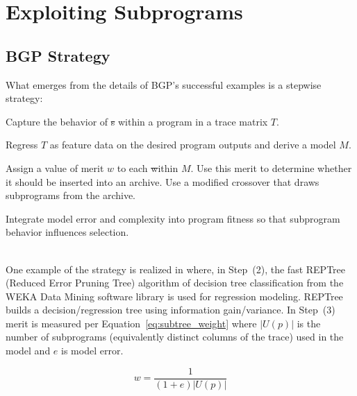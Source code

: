 \section{Exploiting Subprograms}\label{sect:foreground}
\subsection{BGP Strategy}
What emerges from the details of BGP's successful examples is a stepwise strategy:  
\begin{inparaenum}

\item Capture the behavior of \st{s} within a program in a trace matrix $T$.

\item  Regress $T$ as feature data on the desired program outputs and derive a model $M$. 

\item Assign a value of merit $w$ to each \st within $M$. Use this merit to determine whether it should be inserted into an archive. Use a modified crossover that draws subprograms from the archive. 

\item Integrate model error and complexity into program fitness so that subprogram behavior influences selection.
\end{inparaenum} \\


One example of the strategy is realized in \cite{krawiecGecco2014} where, in Step~(2), the fast REPTree (Reduced  Error  Pruning  Tree) algorithm  of decision tree classification from the WEKA Data Mining software library\cite{Hall:2009:WDM:1656274.1656278} is used for regression modeling.  REPTree builds a decision/regression tree using information gain/variance. In Step~(3) merit is measured per Equation~\ref{eq:subtree_weight} where $|U(p)|$ is the number of subprograms (equivalently distinct columns of the trace) used in the model and $e$ is model error.


\begin{equation}
\label{eq:subtree_weight}
w = \frac{1}{(1 + e)|U(p)|}
\end{equation}

